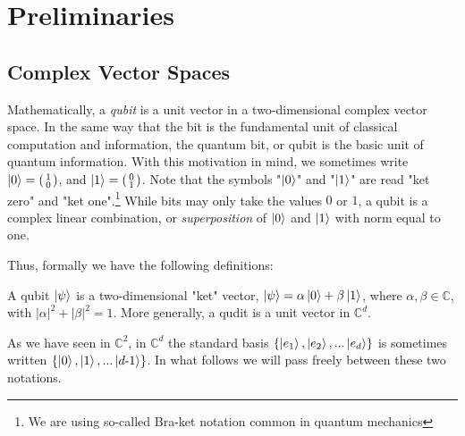
\chapter{Preliminaries} %

\label{Chapter2-preliminaries} %


\section{Complex Vector Spaces} \label{section:complex vector space}




Mathematically, a {\emph{qubit}} is a unit vector in a two-dimensional complex vector space.  In the same way that the bit is the fundamental unit of classical computation and information, the quantum bit, or qubit is the basic unit of quantum information.  With this motivation in mind, we sometimes write $\ket{0} = \left(\begin{smallmatrix}1\\0\end{smallmatrix}\right)$, and $\ket{1} = \left(\begin{smallmatrix}0\\1\end{smallmatrix}\right)$. Note that the symbols "$\ket{0}$" and "$\ket{1}$" are read "ket zero" and "ket one".\footnote{We are using so-called Bra-ket notation common in quantum mechanics}  While bits may only take the values $0$ or $1$, a qubit is a complex linear combination, or \textit{superposition} of $\ket{0}$ and $\ket{1}$ with norm equal to one. 

Thus, formally we have the following definitions:
\begin{definition}
\label{def qubit}
A qubit $\ket{\psi}$ is a two-dimensional "ket" vector, $\ket{\psi}=\alpha\ket{0}+\beta\ket{1}$, 
where $\alpha,\beta\in\mathbb{C}$, with $|\alpha|^2+|\beta|^2=1$.
More generally, a qudit is a unit vector in ${\mathbb{C}}^d$.
\end{definition}



As we have seen in ${\mathbb{C}}^2$, in ${\mathbb{C}}^d$ the standard basis $\{\ket{e_1}, \ket{e_2}, ... \ket{e_d} \}$ is sometimes written $\{\ket{0}, \ket{1}, ...\ket{d\textrm{-}1}\}$.  In what follows we will pass freely between these two notations.



